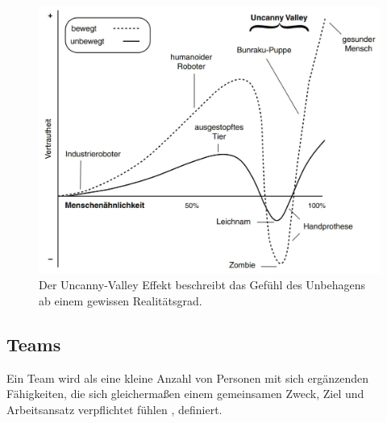 \documentclass[a4paper,11pt]{article}%
\renewcommand{\\}{\vspace*{0.5\baselineskip} \newline}
\begin{document}
\begin{figure}[H]
		\begin{footnotesize}
		\begin{center}
			\includegraphics[scale=.45]{Abbildungen/Uncanny-Valley.JPG}	
			\caption[Der Uncanny-Valley Effekt]{Der Uncanny-Valley Effekt beschreibt das Gefühl des Unbehagens ab einem gewissen Realitätsgrad.}
			\label{Uncanny-Valley}
		\end{center}
		\end{footnotesize}
	\end{figure}	
%
\newpage

	\subsection{Teams}		
	\label{Teamwork}
\label{team}
	Ein Team wird als eine \glqq{} kleine Anzahl von Personen mit sich ergänzenden Fähigkeiten, die sich gleichermaßen einem gemeinsamen Zweck, Ziel und Arbeitsansatz verpflichtet fühlen\dq{} \citep[S. 2]{zenun2007effects}, definiert.
	
\end{document}
